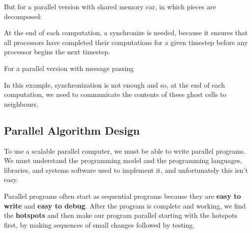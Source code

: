 %
\clearpage
%
\par But for a parallel version with shared memory car, in which pieces are decomposed:
\par At the end of each computation, a synchronize is needed, because it ensures that all processors have completed their computations for a given timestep before any processor begins the next timestep.
\par For a parallel version with message passing
\par In this example, synchronization is not enough and so, at the end of each computation, we need to communicate the contents of these ghost cells to neighbours.
\subsection{Parallel Algorithm Design}
\par To use a scalable parallel computer, we must be able to write
parallel programs. We must understand the programming model and the
programming languages, libraries, and systems software used to
implement it, and unfortunately this isn't easy.
\par Parallel programs often start as sequential programs because they are \textbf{easy to write} and \textbf{easy to debug}. After the program is complete and working, we find the \textbf{hotspots} and then make our program parallel starting with the hotspots first, by making sequences of small changes followed by testing.
\begin{center}
\end{center}
%
\clearpage
%
